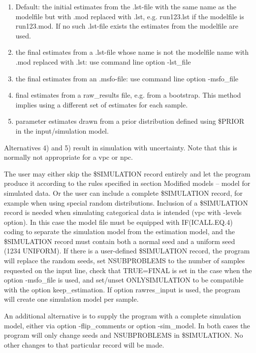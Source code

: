 \begin{enumerate}
	\item Default: the initial estimates from the .lst-file with the same name as the modelfile but with .mod replaced with .lst, e.g. run123.lst if the modelfile is run123.mod. If no such .lst-file exists the estimates from the modelfile are used.
    \item the final estimates from a .lst-file whose name is not the modelfile name with .mod replaced with .lst: use command line option \mbox{-lst\_file}
    \item the final estimates from an .msfo-file: use command line option \mbox{-msfo\_file}
	\item final estimates from a raw\_results file, e.g. from a bootstrap. This method implies using a different set of estimates for each sample. 
	\item parameter estimates drawn from a prior distribution defined using \$PRIOR in the input/simulation model.
\end{enumerate}

Alternatives 4) and 5) result in simulation with uncertainty. Note that this is normally not appropriate for a vpc or npc. 

The user may either skip the \$SIMULATION record entirely and let the program produce it according to the rules specified in section Modified models – model for simulated data. Or the user can include a complete \$SIMULATION record, for example when using special random distributions. Inclusion of a \$SIMULATION record is needed when simulating categorical data is intended (vpc with -levels option). In this case the model file must be equipped with IF(ICALL.EQ.4) coding to separate the simulation model from the estimation model, and the \$SIMULATION record must contain both a normal seed and a uniform seed (1234 UNIFORM). If there is a user-defined \$SIMULATION record, the program will replace the random seeds, set NSUBPROBLEMS to the number of samples requested on the input line, check that TRUE=FINAL is set in the case when the option -msfo\_file is used, and set/unset ONLYSIMULATION to be compatible with the option keep\_estimation. If option rawres\_input is used, the program will create one simulation model per sample.

An additional alternative is to supply the program with a complete simulation model, either via option -flip\_comments or option -sim\_model. In both cases the program will only change seeds and NSUBPROBLEMS in \$SIMULATION. No other changes to that particular record will be made.

